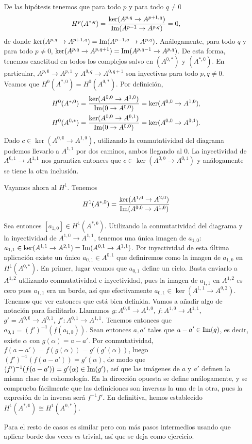 \documentclass[twoside]{article}
\begin{document}
\begin{solucion}
De las hipótesis tenemos que para todo $p$ y para todo $q\neq 0$
\[
H^p(A^{*,q})=\frac{\ker(A^{p,q}\to A^{p+1,q})}{\operatorname{Im}(A^{p-1}\to A^{p,q})}=0,
\]
de donde $\ker(A^{p,q}\to A^{p+1,q})=\operatorname{Im}(A^{p-1,q}\to A^{p,q})$. Análogamente, para todo $q$ y para todo $p\neq 0$, $\ker(A^{p,q}\to A^{p,q+1})=\operatorname{Im}(A^{p,q-1}\to A^{p,q})$. De esta forma, tenemos exactitud en todos los complejos salvo en $(A^{0,*})$ y $(A^{*,0})$. En particular, $A^{p,0}\to A^{p,1}$ y $A^{0,q}\to A^{0,q+1}$ son inyectivas para todo $p,q\neq 0$. Veamos que $H^0(A^{*,0})= H^0(A^{0,*})$. Por definición, 
\begin{align*}
& H^0(A^{*,0})=\frac{\ker(A^{0,0}\to A^{1,0})}{\operatorname{Im}(0\to A^{0,0})}=\ker(A^{0,0}\to A^{1,0}),\\
& H^0(A^{0,*})= \frac{\ker(A^{0,0}\to A^{0,1})}{\operatorname{Im}(0\to A^{0,0})}=\ker(A^{0,0}\to A^{0,1}).
\end{align*}
Dado $c\in \ker(A^{0,0}\to A^{1,0})$, utilizando la conmutatividad del diagrama podemos llevarlo a $A^{1,1}$ por dos caminos, ambos llegando al 0. La inyectividad de $A^{0,1}\to A^{1,1}$ nos garantiza entonces que $c\in \ker(A^{0,0}\to A^{0,1})$ y análogamente se tiene la otra inclusión. 

Vayamos ahora al $H^1$. Tenemos
$$
H^1(A^{*,0})=\frac{\ker(A^{1,0}\to A^{2,0})}{\operatorname{Im}(A^{0,0}\to A^{1,0})}
$$

Sea entonces $[a_{1,0}]\in H^1(A^{*,0})$. Utilizando la conmutatividad del diagrama y la inyectividad de $A^{1,0}\to A^{1,1}$, tenemos una única imagen de $a_{1,0}$: $a_{1,1}\in \ker(A^{1,1}\to A^{2,1})=\operatorname{Im}(A^{0,1}\to A^{1,1})$. Por inyectividad de esta última aplicación existe un único $a_{0,1}\in A^{0,1}$ que definiremos como la imagen de $a_{1,0}$ en $H^1(A^{0,*})$. En primer, lugar veamos que $a_{0,1}$ define un ciclo. Basta enviarlo a $A^{1,2}$ utilizando conmutatividad e inyectividad, pues la imagen de $a_{1,1}$ en $A^{1,2}$ es cero pues $a_{1,1}$ era un borde, así que efectivamente $a_{0,1}\in\ker(A^{1,1}\to A^{0,2})$. Tenemos que ver entonces que está bien definida. Vamos a añadir algo de notación para facilitarlo. Llamamos $g:A^{0,0}\to A^{1,0}$, $f:A^{1,0}\to A^{1,1}$, $g'=A^{0,0}\to A^{0,1}$, $f':A^{0,1}\to A^{1,1}$. Tenemos entonces que $a_{0,1}=(f')^{-1}(f(a_{1,0}))$. Sean entonces $a,a'$ tales que $a-a'\in \operatorname{Im}(g)$, es decir, existe $\alpha$ con $g(\alpha)=a-a'$. Por conmutatividad, $f(a-a')=f(g(\alpha))=g'(g'(\alpha))$, luego $(f')^{-1}(f(a-a'))=g'(\alpha)$, de modo que  $(f')^{-1}(f(a-a'))=g'(\alpha)\in\operatorname{Im}(g')$, así que las imágenes de $a$ y $a'$ definen la misma clase de cohomología. En la dirección opuesta se define análogamente, y se comprueba fácilmente que las definiciones son inversas la una de la otra, pues la expresión de la inversa será $f^{-1}f'$. En definitiva, hemos establecido $ H^1(A^{*,0})\cong  H^1(A^{0,*})$.

Para el resto de casos es similar pero con más pasos intermedios usando que aplicar borde dos veces es trivial, así que se deja como ejercicio.
\end{solucion}
\newpage
\end{document}
